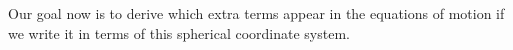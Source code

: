 



Our goal now is to derive which extra terms appear in the equations of motion if we write it in terms of this spherical coordinate system.

